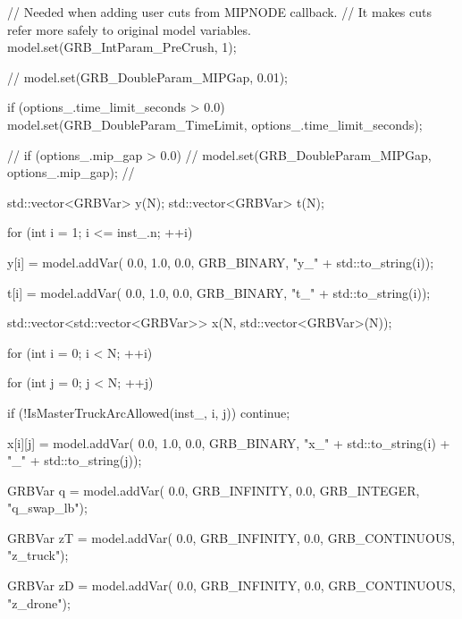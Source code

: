 {{{            // Needed when adding user cuts from MIPNODE callback.
            // It makes cuts refer more safely to original model variables.
            model.set(GRB_IntParam_PreCrush, 1);

            // model.set(GRB_DoubleParam_MIPGap, 0.01);

            if (options_.time_limit_seconds > 0.0)
            {
                model.set(GRB_DoubleParam_TimeLimit, options_.time_limit_seconds);
            }

            // if (options_.mip_gap > 0.0) {
            //     model.set(GRB_DoubleParam_MIPGap, options_.mip_gap);
            // }

            std::vector<GRBVar> y(N);
            std::vector<GRBVar> t(N);

            for (int i = 1; i <= inst_.n; ++i)
            {
                y[i] = model.addVar(
                    0.0,
                    1.0,
                    0.0,
                    GRB_BINARY,
                    "y_" + std::to_string(i));

                t[i] = model.addVar(
                    0.0,
                    1.0,
                    0.0,
                    GRB_BINARY,
                    "t_" + std::to_string(i));
            }

            std::vector<std::vector<GRBVar>> x(N, std::vector<GRBVar>(N));

            for (int i = 0; i < N; ++i)
            {
                for (int j = 0; j < N; ++j)
                {
                    if (!IsMasterTruckArcAllowed(inst_, i, j))
                        continue;

                    x[i][j] = model.addVar(
                        0.0,
                        1.0,
                        0.0,
                        GRB_BINARY,
                        "x_" + std::to_string(i) + "_" + std::to_string(j));
                }
            }

            GRBVar q = model.addVar(
                0.0,
                GRB_INFINITY,
                0.0,
                GRB_INTEGER,
                "q_swap_lb");

            GRBVar zT = model.addVar(
                0.0,
                GRB_INFINITY,
                0.0,
                GRB_CONTINUOUS,
                "z_truck");

            GRBVar zD = model.addVar(
                0.0,
                GRB_INFINITY,
                0.0,
                GRB_CONTINUOUS,
                "z_drone");

}}}
